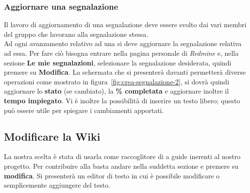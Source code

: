 \documentclass{scalatekids-article}
\begin{document}
    \subsubsection{Aggiornare una segnalazione}

    Il lavoro di aggiornamento di una segnalazione deve essere svolto dai vari
    membri del gruppo che lavorano alla segnalazione stessa.\\ Ad ogni avanzamento
    relativo ad una  si deve aggiornare la segnalazione relativa ad
    essa. Per fare ciò bisogna entrare nella pagina personale di \textit{Redmine} e,
    nella sezione \textbf{Le mie segnalazioni}, selezionare la segnalazione
    desiderata, quindi premere su \textbf{Modifica}. La schermata che si presenterà
    davanti permetterà diverse operazioni come mostrato in figura~\ref{fig:crea-segnalazione-2},
    si dovrà quindi aggiornare lo \textbf{stato} (se
    cambiato), la \textbf{\% completata} e aggiornare inoltre il \textbf{tempo
    impiegato}. Vi è inoltre la possibilità di inserire un testo libero; questo
    può essere utile per spiegare i cambiamenti apportati.

    \subsection{Modificare la Wiki}

    La nostra scelta è stata di usarla come raccoglitore di  a guide inerenti al nostro progetto.
    Per contribuire alla  basta andare nella suddetta sezione e premere su \textbf{modifica}. Si presenterà un editor di testo in cui è possibile modificare o semplicemente aggiungere del testo.

    \listoffigures

    
\end{document}
